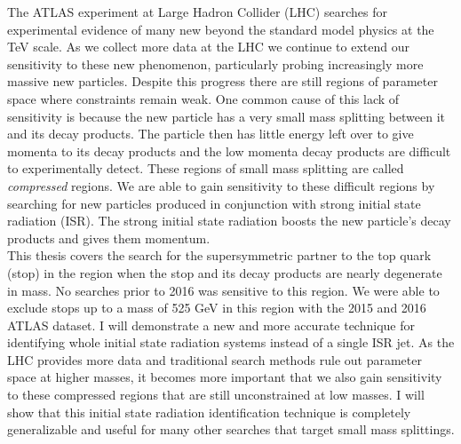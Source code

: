 
The ATLAS experiment at Large Hadron Collider (LHC) searches for experimental evidence of many new beyond the standard model physics at the TeV scale.   As we collect more data at the LHC we continue to extend our sensitivity to these new phenomenon, particularly probing increasingly more massive new particles.  Despite this progress there are still regions of parameter space where constraints remain weak.   One common cause of this lack of sensitivity is because the new particle has a very small mass splitting between it and its decay products.  The particle then has little energy left over to give momenta to its decay products and the low momenta decay products are difficult to experimentally detect. These regions of small mass splitting are called {\it compressed} regions.  We are able to gain sensitivity to these difficult regions by searching for new particles produced in conjunction with strong initial state radiation (ISR).  The strong initial state radiation boosts the new particle's decay products and gives them momentum.  \\

This thesis covers the search for the supersymmetric partner to the top quark (stop) in the region when the stop and its decay products are nearly degenerate in mass.  No searches prior to 2016 was sensitive to this region.  We were able to exclude stops up to a mass of 525 GeV in this region with the 2015 and 2016 ATLAS dataset.  I will demonstrate a new and more accurate technique for identifying whole initial state radiation systems instead of a single ISR jet.   As the LHC provides more data and traditional search methods rule out parameter space at higher masses, it becomes more important that we also gain sensitivity to these compressed regions that are still unconstrained at low masses.  I will show that this initial state radiation identification technique is completely generalizable and useful for many other searches that target small mass splittings.